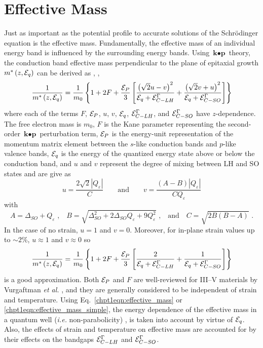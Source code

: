 \documentclass[12pt]{report}
\begin{document}
{\section{Effective Mass}

Just as important as the potential profile to accurate solutions of the Schr\"{o}dinger equation is the effective mass.  Fundamentally, the effective mass of an individual energy band is influenced by the surrounding energy bands. Using $\textbf{k}\bullet \textbf{p}$ theory, the conduction band effective mass perpendicular to the plane of epitaxial growth $m^*\left(z,\EE_q\right)$ can be derived as \cite{Sirtori:PRB:1994}, \cite{Vurgaftman}, \cite{Sugawara:PRB:1993}
\begin{equation}
\label{chpt1eqn:effective_mass}
\frac{1}{m^*\left(z,\EE_q\right)} = \frac{1}{m_0} \left\{1+2F+\frac{\EE_P}{3} \left[ \frac{ \left(\sqrt{2} u-v\right)^2}{\EE_q + \EE_{C-{LH}}^\Gamma} + \frac{ \left(\sqrt{2} v+u \right)^2}{\EE_q + \EE_{C-{SO}}^\Gamma} \right] \right\}
\end{equation}
where each of the terms $F$, $\EE_P$, $u$, $v$, $\EE_q$, $\EE_{C-{LH}}^\Gamma$, and $\EE_{C-{SO}}^\Gamma$ have $z$-dependence.  The free electron mass is $m_0$, $F$ is the Kane parameter representing the second-order $\textbf{k}\bullet \textbf{p}$ perturbation term, $\EE_P$ is the energy-unit representation of the momentum matrix element between the $s$-like conduction bands and $p$-like valence bands, $\EE_q$ is the energy of the quantized energy state above or below the conduction band, and $u$ and $v$ represent the degree of mixing between LH and SO states and are give as
\begin{equation}
u = \frac{2\sqrt{2} |Q_\varepsilon|}{C} \qquad \text{and} \qquad
v = \frac{(A-B) |Q_\varepsilon|}{C Q_\varepsilon}
\end{equation}
with
\begin{equation}
A=\Delta_{{SO}}+Q_\varepsilon \text{ ,} \quad
B=\sqrt{\Delta_{{SO}}^2+2 \Delta_{{SO}} Q_\varepsilon +9 Q_\varepsilon^2}\text{ ,}\quad \text{and} \quad
C=\sqrt{2 B (B-A)} \text{~.}
\end{equation}
In the case of no strain, $u=1$ and $v=0$.  Moreover, for in-plane strain values up to $\sim\!2$\%, $u\approx1$ and $v\approx0$ so
\begin{equation}
\label{chpt1eqn:effective_mass_simple}
\frac{1}{m^*\left(z,\EE_q\right)} = \frac{1}{m_0} \left\{ 1+2F+ \frac{\EE_P}{3} \left[ \frac{2}{\EE_q + \EE_{C-{LH}}^\Gamma} + \frac{1}{\EE_q + \EE_{C-{SO}}^\Gamma} \right] \right\}
\end{equation}
is a good approximation.  Both $\EE_P$ and $F$ are well-reviewed for III--V materials by Vurgaftman \emph{et al.} \cite{Vurgaftman}, and they are generally considered to be independent of strain and temperature.  Using Eq.~\eqref{chpt1eqn:effective_mass} or \eqref{chpt1eqn:effective_mass_simple}, the energy dependence of the effective mass in a quantum well (\emph{i.e.} non-parabolicity) \cite{Sirtori:PRB:1994}, \cite{Nelson:PRB:1987} is taken into account by virtue of $\EE_q$.  Also, the effects of strain and temperature on effective mass are accounted for by their effects on the bandgaps $\EE_{C-{LH}}^\Gamma$ and $\EE_{C-{SO}}^\Gamma$.



}
\end{document}
